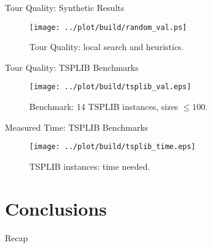 \documentclass[
  size=8pt,
  style=klope,
  paper=screen,
  mode=present,
  nohandoutpagebreaks,
  pauseslide,
  hlsections,
  fleqn,
]{powerdot}
\begin{document}
\begin{slide}[toc=Benchmarks: Solutions]{Tour Quality: Synthetic Results}
  \begin{figure}[H]
    \centering
    \texttt{[image: ../plot/build/random\_val.ps]}
    \caption{Tour Quality: local search and heuristics.}
  \end{figure}
\end{slide}

\begin{slide}[toc=]{Tour Quality: TSPLIB Benchmarks}
  \begin{figure}[H]
    \centering
    \texttt{[image: ../plot/build/tsplib\_val.eps]}
    \caption{Benchmark: 14 TSPLIB instances, sizes $\leq 100$.}
  \end{figure}
\end{slide}

\begin{slide}[toc=]{Measured Time: TSPLIB Benchmarks}
  \begin{figure}[H]
    \centering
    \texttt{[image: ../plot/build/tsplib\_time.eps]}
    \caption{TSPLIB instances: time needed.}
  \end{figure}
\end{slide}

\section[template=wideslide]{Conclusions}

\begin{slide}[toc=Recap]{Recap}
\tableofcontents[content=all,type=0]
\end{slide}
\end{document}
